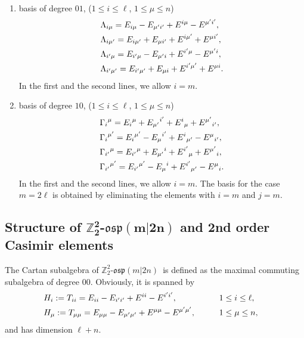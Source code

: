 \documentclass[pdftex]{sigma}
\numberwithin{equation}{section}
\theoremstyle{definition}
\def\nn{\notag}
\def\Z2{\mathbb{Z}_2^2}
\def\osp{\mathfrak{osp}}
\def\Zosp{$\Z2$-$\osp(m|2n)$}
\begin{document}
\begin{enumerate}
\begin{align*}
	&{U_{\mu'}}^{\nu}=
	\begin{cases}
		{E_{\mu'}}^{\nu}+{E_{\nu'}}^{\mu}+{E^{\mu'}}_{\nu}+{E^{\nu'}}_{\mu},& 1 \leq \mu<\nu \leq n,\\
		{E_{\mu'}}^{\mu}+{E^{\mu'}}_{\mu},& \mu=\nu.
	\end{cases}
\end{align*}
\item[(iii)] basis of degree $01$, ($1 \leq i \leq \ell$, $1 \leq \mu \leq n$)
\begin{align*}
	&\Lambda_{i\mu}=E_{i\mu}-E_{\mu'i'}+E^{i\mu}-E^{\mu'i'},
	\notag\\
	&\Lambda_{i\mu'}=E_{i\mu'}+E_{\mu i'}+E^{i\mu'}+E^{\mu i'},
	\notag\\
	&\Lambda_{i'\mu}=E_{i'\mu}-E_{\mu'i}+E^{i'\mu}-E^{\mu'i},
	\notag\\
	&\Lambda_{i'\mu'}=E_{i'\mu'}+E_{\mu i}+E^{i'\mu'}+E^{\mu i}.
\end{align*}
In the first and the second lines, we allow $ i =m$.
\item[(iv)] basis of degree $10$, ($1 \leq i \leq \ell$, $1 \leq \mu \leq n$)
\begin{align*}
&	{\Gamma_{i}}^{\mu}={E_{i}}^{\mu}+{E_{\mu'}}^{i'}+{E^{i}}_{\mu}+{E^{\mu'}}_{i'},
	\notag\\
&	{\Gamma_{i}}^{\mu'}={E_{i}}^{\mu'}-{E_{\mu}}^{i'}+{E^{i}}_{\mu'}-{E^{\mu}}_{i'},
	\notag\\
&	{\Gamma_{i'}}^{\mu}={E_{i'}}^{\mu}+{E_{\mu'}}^{i}+{E^{i'}}_{\mu}+{E^{\mu'}}_{i},
	\notag\\
&	{\Gamma_{i'}}^{\mu'}={E_{i'}}^{\mu'}-{E_{\mu}}^{i}+{E^{i'}}_{\mu'}-{E^{\mu}}_{i}.
\end{align*}
In the first and the second lines, we allow $ i =m$.
The basis for the case $m = 2\ell$ is obtained by eliminating the elements with $i=m $ and $j=m$.
\end{enumerate}

\subsection[Structure of Z\_2\^{}2-osp(m|2n) and 2nd order Casimir elements]{Structure of $\boldsymbol{\Z2}$-$\boldsymbol{\osp(m|2n)}$ and 2nd order Casimir elements}

The Cartan subalgebra of \Zosp\ is defined as the maximal commuting subalgebra of degree $00$.
Obviously, it is spanned by
\begin{alignat}{3}
&	H_i:= T_{ii} = E_{ii} - E_{i'i'} + E^{ii} - E^{i'i'}, \qquad&&
	 1 \leq i \leq \ell ,&
	\nn \\
	&H_{\mu}:= T_{\mu\mu} = E_{\mu\mu} - E_{\mu'\mu'} + E^{\mu\mu} - E^{\mu'\mu'},\qquad
	& & 1 \leq \mu \leq n,&
\end{alignat}
and has dimension $\ell+n$.
\end{document}
